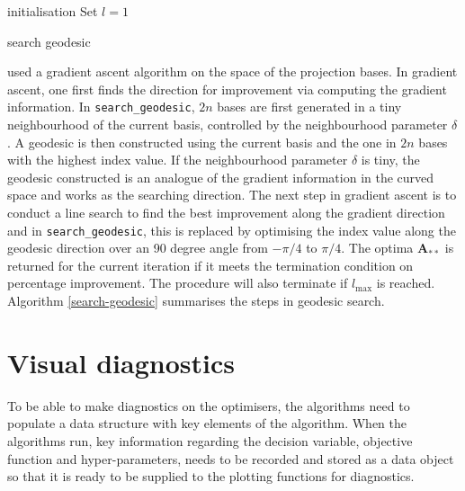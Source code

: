 \begin{algorithm}
\SetAlgoLined
{}
  initialisation\;
  Set $l = 1$\;
  \caption{search geodesic}
  \label{search-geodesic}
\end{algorithm}

\citet{cook1995grand} used a gradient ascent algorithm on the space of
the projection bases. In gradient ascent, one first finds the direction
for improvement via computing the gradient information. In
\texttt{search\_geodesic}, \(2n\) bases are first generated in a tiny
neighbourhood of the current basis, controlled by the neighbourhood
parameter \(\delta\). A geodesic is then constructed using the current
basis and the one in \(2n\) bases with the highest index value. If the
neighbourhood parameter \(\delta\) is tiny, the geodesic constructed is
an analogue of the gradient information in the curved space and works as
the searching direction. The next step in gradient ascent is to conduct
a line search to find the best improvement along the gradient direction
and in \texttt{search\_geodesic}, this is replaced by optimising the
index value along the geodesic direction over an 90 degree angle from
\(-\pi/4\) to \(\pi/4\). The optima \(\mathbf{A}_{**}\) is returned for
the current iteration if it meets the termination condition on
percentage improvement. The procedure will also terminate if
\(l_{\max}\) is reached. Algorithm \ref{search-geodesic} summarises the
steps in geodesic search.

\hypertarget{vis-diag}{%
\section{Visual diagnostics}\label{vis-diag}}

To be able to make diagnostics on the optimisers, the algorithms need to
populate a data structure with key elements of the algorithm. When the
algorithms run, key information regarding the decision variable,
objective function and hyper-parameters, needs to be recorded and stored
as a data object so that it is ready to be supplied to the plotting
functions for diagnostics.

